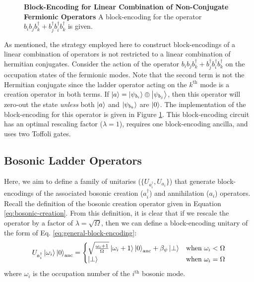 \begin{figure}
    
    \caption{
        \textbf{Block-Encoding for Linear Combination of Non-Conjugate Fermionic Operators}
        A block-encoding for the operator $b_i b_j b_k^\dagger + b_j^\dagger b_i^\dagger b_k^\dagger$ is given.
    }
    \label{fig:fermionic-be-lc-not-conjugate}
\end{figure}


As mentioned, the strategy employed here to construct block-encodings of a linear combination of operators is not restricted to a linear combination of hermitian conjugates.
Consider the action of the operator $b_i b_j b_k^\dagger + b_j^\dagger b_i^\dagger b_k^\dagger$ on the occupation states of the fermionic modes.
Note that the second term is not the Hermitian conjugate since the ladder operator acting on the $k^\text{th}$ mode is a creation operator in both terms.
If $\ket{a} = \ket{\psi_{b_i}} \oplus \ket{\psi_{b_j}}$, then this operator will zero-out the state \textit{unless} both $\ket{a}$ and $\ket{\psi_{b_k}}$ are $\ket{0}$.
The implementation of the block-encoding for this operator is given in Figure \ref{fig:fermionic-be-lc-not-conjugate}.
This block-encoding circuit has an optimal rescaling factor ($\lambda = 1$), requires one block-encoding ancilla, and uses two Toffoli gates.

\subsection{Bosonic Ladder Operators}

Here, we aim to define a family of unitaries ($\{U_{a^\dagger_i}, U_{a_i}\}$) that generate block-encodings of the associated bosonic creation ($a_i^\dagger$) and annihilation ($a_i$) operators.
Recall the definition of the bosonic creation operator given in Equation \ref{eq:bosonic-creation}.
From this definition, it is clear that if we rescale the operator by a factor of $\lambda = \sqrt{\Omega}$, then we can define a block-encoding unitary of the form of Eq. \ref{eq:general-block-encoding}: 
\begin{equation}
    \label{eq:be-bos-creation}
    U_{a^\dagger_i} \ket{\omega_i} \ket{0}_\text{anc} = 
    \begin{cases}
        \sqrt{\frac{\omega_i + 1}{\Omega}} \ket{\omega_i + 1} \ket{0}_\text{anc} + \beta_\psi \ket{\perp} & \text{when } \omega_i < \Omega \\
        \ket{\perp} & \text{when } \omega_i = \Omega \\
    
    \end{cases}
\end{equation}
where $\omega_i$ is the occupation number of the $i^\text{th}$ bosonic mode.

